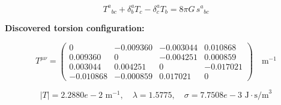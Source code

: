 
\begin{equation}
  T^a{}_{bc} + \delta^a_b T_c - \delta^a_c T_b = 8\pi G \, s^a{}_{bc}
\end{equation}

\textbf{Discovered torsion configuration:}

\begin{equation}
  T^{\mu\nu} = \begin{pmatrix}
    0 & -0.009360 & -0.003044 & 0.010868 \\
    0.009360 & 0 & -0.004251 & 0.000859 \\
    0.003044 & 0.004251 & 0 & -0.017021 \\
    -0.010868 & -0.000859 & 0.017021 & 0
  \end{pmatrix} \quad \text{m}^{-1}
\end{equation}

\begin{equation}
  |T| = 2.2880e-2 \text{ m}^{-1}, \quad
  \lambda = 1.5775, \quad
  \sigma = 7.7508e-3 \text{ J}\cdot\text{s/m}^3
\end{equation}